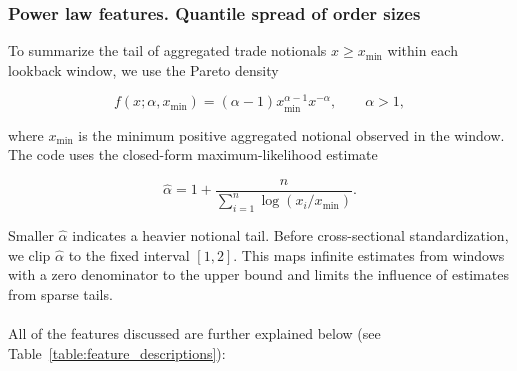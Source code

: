 \documentclass{ieeeaccess}
\begin{document}
\subsubsection{Power law features. Quantile spread of order sizes}

To summarize the tail of aggregated trade notionals $x\geq x_{\min}$ within each lookback window, we use the Pareto density

\begin{equation}
    f(x;\alpha,x_{\min})=(\alpha-1)x_{\min}^{\alpha-1}x^{-\alpha}, \qquad \alpha>1,
    \label{eq:powerlaw_pdf}
\end{equation}

where $x_{\min}$ is the minimum positive aggregated notional observed in the window. The code uses the closed-form maximum-likelihood estimate

\begin{equation}
    \hat{\alpha}=1+\frac{n}{\sum_{i=1}^{n}\log(x_i/x_{\min})}.
    \label{eq:powerlaw_ols}
\end{equation}

Smaller $\hat{\alpha}$ indicates a heavier notional tail. Before cross-sectional standardization, \textcolor{revisionblue}{we clip $\hat{\alpha}$ to} the \textcolor{revisionblue}{fixed} interval $[1,2]$. This \textcolor{revisionblue}{maps infinite estimates from windows with a zero denominator to the upper} bound \textcolor{revisionblue}{and limits} the influence of \textcolor{revisionblue}{estimates from} sparse tails.
\\ \\
All of the features discussed are further explained below (see Table~\ref{table:feature_descriptions}):
\end{document}
